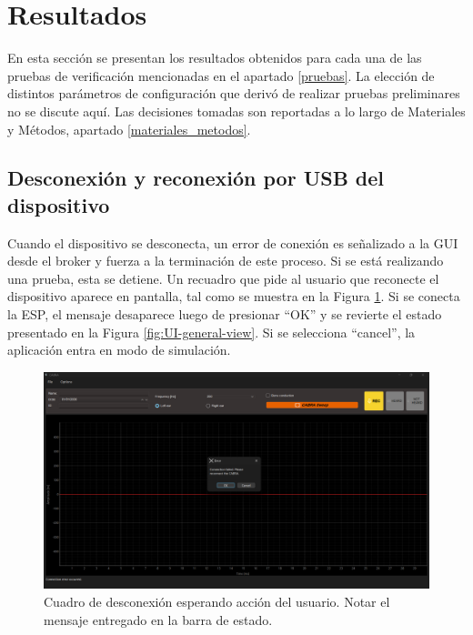 \section{Resultados} \label{resultados}

En esta sección se presentan los resultados obtenidos para cada una de las pruebas de verificación mencionadas en el apartado \ref{pruebas}. La elección de distintos parámetros de configuración que derivó de realizar pruebas preliminares no se discute aquí. Las decisiones tomadas son reportadas a lo largo de Materiales y Métodos, apartado \ref{materiales_metodos}.

\subsection{Desconexión y reconexión por USB del dispositivo}

Cuando el dispositivo se desconecta, un error de conexión es señalizado a la GUI desde el broker y fuerza a la terminación de este proceso. Si se está realizando una prueba, esta se detiene. Un recuadro que pide al usuario que reconecte el dispositivo aparece en pantalla, tal como se muestra en la Figura \ref{fig:UI-ESP-Disconected}. Si se conecta la ESP, el mensaje desaparece luego de presionar ``OK'' y se revierte el estado presentado en la Figura \ref{fig:UI-general-view}. Si se selecciona ``cancel'', la aplicación entra en modo de simulación.

\begin{figure}[H]
    \centering
    \includegraphics[width=1\linewidth]{figuras/UI-ESP-disconected.png}
    \caption{Cuadro de desconexión esperando acción del usuario. Notar el mensaje entregado en la barra de estado.}
    \label{fig:UI-ESP-Disconected}
\end{figure}

